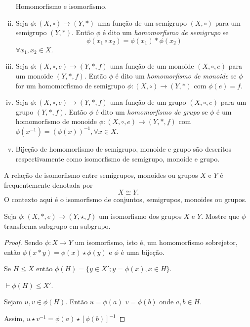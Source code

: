 \begin{definition}[Magma]
         \begin{definition}
            \begin{enumerate}[i.]
               Homomorfismo e isomorfismo.
               \item Seja $\phi: (X, \circ) \to (Y, *)$ uma função de um semigrupo $(X, \circ)$ para um semigrupo $(Y,*)$. Então $\phi$ é dito um \emph{homomorfismo de semigrupo} se $$\phi(x_{1}\circ x_{2}) = \phi(x_{1}) * \phi(x_{2})$$ $\forall x_{1},x_{2} \in X$.
               \item Seja $\phi: (X,\circ, e) \to (Y, *, f)$ uma função de um monoide $(X, \circ , e)$ para um monoide $(Y, *, f)$. Então $\phi$ é dito um \emph{homomorfismo de monoide} se $\phi$ for um homomorfismo de semigrupo $\phi: (X,\circ) \to (Y,*)$ com $\phi(e) = f$.
               \item Seja $\phi: (X,\circ , e) \to (Y, *, f)$ uma função de um grupo $(X,\circ, e)$ para um grupo $(Y, *, f)$. Então $\phi$ é dito um \emph{homomorfismo de grupo} se $\phi$ é um homomorfismo de monoide $\phi: (X,\circ, e) \to (Y, *, f)$ com $\phi(x^{-1}) = (\phi(x))^{-1}, \forall x \in X$.
               \item Bijeção de homomorfismo de semigrupo, monoide e grupo são descritos respectivamente como isomorfismo de semigrupo, monoide e grupo.
            \end{enumerate}
         \end{definition}
         A relação de isomorfismo entre semigrupos, monoides ou grupos $X$ e $Y$ é frequentemente denotada por $$X\cong Y.$$ O contexto aqui é o isomorfismo de conjuntos, semigrupos, monoides ou grupos.

         \begin{exmp}
            Seja $\phi:(X, *, e) \to (Y, \star, f)$ um isomorfismo dos grupos $X$ e $Y$. Mostre que $\phi$ transforma subgrupo em subgrupo.
            \begin{proof}
               Sendo $\phi: X \to Y$ um isomorfismo, isto é, um homomorfismo sobrejetor, então $\phi(x*y) = \phi(x) \star \phi(y)$ e $\phi$ é uma bijeção.

               Se $H \leq X$ então $\phi(H) = \{y \in X'; y = \phi(x), x\in H\}$.

               \quad $\vdash \phi(H) \leq X'$.

               Sejam $u,v \in \phi(H)$. Então $u = \phi(a)$ $v = \phi(b)$ onde $a,b \in H$.

               Assim, $u \star v^{-1} = \phi(a) \star [\phi(b)]^{-1}$


\end{proof}
\end{exmp}
\end{definition}

